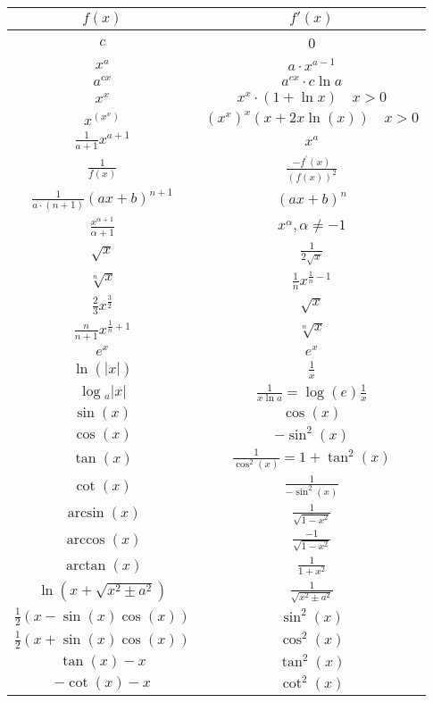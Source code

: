 \begin{tabular}{c||c}
    $f(x)$ & $f'(x)$ \\
    \hline$c$ & 0 \\
    $x^{a}$ & $a \cdot x^{a-1}$ \\
    $a^{c x}$ & $a^{c x} \cdot c \ln a$ \\
    $x^{x}$ & $x^{x} \cdot(1+\ln x) \quad x>0$ \\
    $x^{\left(x^{x}\right)}$ & $\left(x^{x}\right)^{x}(x+2 x \ln (x)) \quad x>0$ \\
    $\frac{1}{a+1} x^{a+1}$ & $x^{a}$ \\
    $\frac{1}{f(x)}$ & $\frac{-f^{\prime}(x)}{(f(x))^{2}}$ \\
    $\frac{1}{a \cdot(n+1)}(a x+b)^{n+1}$ & $(a x+b)^{n}$ \\
    $\frac{x^{\alpha+1}}{\alpha+1}$ & $x^{\alpha}, \alpha \neq-1$ \\
    $\sqrt{x}$ & $\frac{1}{2 \sqrt{x}}$ \\
    $\sqrt[n]{x}$ & $\frac{1}{n} x^{\frac{1}{n}-1}$ \\
    $\frac{2}{3} x^{\frac{3}{2}}$ & $\sqrt{x}$ \\
    $\frac{n}{n+1} x^{\frac{1}{n}+1}$ & $\sqrt[n]{x}$ \\
    $e^{x}$ & $e^{x}$ \\
    $\ln (|x|)$ & $\frac{1}{x}$ \\
    $\log { }_{a}|x|$ & $\frac{1}{x \ln a}=\log (e) \frac{1}{x}$ \\
    $\sin (x)$ & $\cos (x)$ \\
    $\cos (x)$ & $-\sin ^{2}(x)$ \\
    $\tan (x)$ & $\frac{1}{\cos ^{2}(x)}=1+\tan ^{2}(x)$ \\
    $\cot (x)$ & $\frac{1}{-\sin ^{2}(x)}$ \\
    $\arcsin (x)$ & $\frac{1}{\sqrt{1-x^{2}}}$ \\
    $\arccos (x)$ & $\frac{-1}{\sqrt{1-x^{2}}}$ \\
    $\arctan (x)$ & $\frac{1}{1+x^{2}}$ \\
      $\ln \left(x+\sqrt{x^{2} \pm a^{2}}\right)$ & $\frac{1}{\sqrt{x^{2} \pm a^{2}}}$ \\
     $\frac{1}{2}(x-\sin (x) \cos (x))$ & $\sin ^{2}(x)$ \\
     $\frac{1}{2}(x+\sin (x) \cos (x))$ & $\cos ^{2}(x)$ \\
      $\tan (x)-x$ & $\tan ^{2}(x)$ \\
     $-\cot (x)-x$ & $\cot ^{2}(x)$ \\

\end{tabular}

